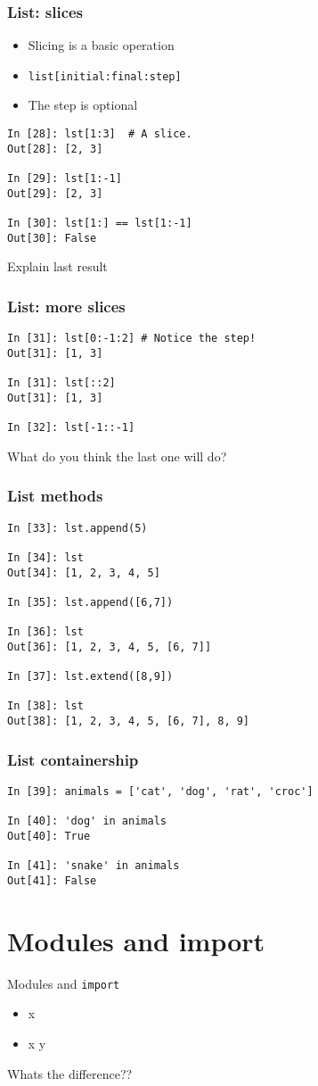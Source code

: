 \documentclass[14pt,compress]{beamer}
\newcounter{time}
\newcommand{\inctime}[1]{\addtocounter{time}{#1}{\tiny \thetime\ m}}
\newcommand{\typ}[1]{\texttt{#1}}
\newcommand{\kwrd}[1]{ \texttt{\textbf{\color{blue}{#1}}}  }
\begin{document}
\begin{frame}[fragile]
  \frametitle{List: slices}
  \begin{itemize}
  \item Slicing is a basic operation
  \item \typ{list[initial:final:step]}
  \item  The step is optional
  \end{itemize}
\begin{lstlisting}
In [28]: lst[1:3]  # A slice.
Out[28]: [2, 3]

In [29]: lst[1:-1]
Out[29]: [2, 3]

In [30]: lst[1:] == lst[1:-1]
Out[30]: False
\end{lstlisting}
Explain last result
\end{frame}

\begin{frame}[fragile]
  \frametitle{List: more slices}
\begin{lstlisting}
In [31]: lst[0:-1:2] # Notice the step!
Out[31]: [1, 3]

In [31]: lst[::2]
Out[31]: [1, 3]

In [32]: lst[-1::-1]
\end{lstlisting}
What do you think the last one will do?
\end{frame}

\begin{frame}[fragile]
  \frametitle{List methods}
\begin{lstlisting}
In [33]: lst.append(5)

In [34]: lst
Out[34]: [1, 2, 3, 4, 5]

In [35]: lst.append([6,7])

In [36]: lst
Out[36]: [1, 2, 3, 4, 5, [6, 7]]

In [37]: lst.extend([8,9])

In [38]: lst
Out[38]: [1, 2, 3, 4, 5, [6, 7], 8, 9]
\end{lstlisting}
\end{frame}

\begin{frame}[fragile]
  \frametitle{List containership}
  \begin{lstlisting}
In [39]: animals = ['cat', 'dog', 'rat', 'croc']

In [40]: 'dog' in animals
Out[40]: True

In [41]: 'snake' in animals
Out[41]: False
  \end{lstlisting}
  \inctime{10}
\end{frame}

\section{Modules and import}
\begin{frame}{Modules and \typ{import}}
  \begin{itemize}
    \item \kwrd{import} x
    \item \kwrd{from} x \kwrd{import} y
  \end{itemize}
Whats the difference??
\inctime{5}
\end{frame}
\end{document}
